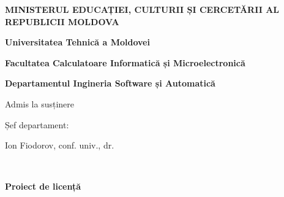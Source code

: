 \newcommand{\facultyname}{Facultatea Calculatoare Informatică și Microelectronică}
\newcommand{\departmentname}{Departamentul Ingineria Software și  Automatică}
\newcommand{\departmentchiefname}{Ion Fiodorov}
\newcommand{\departmentchieftitle}{conf. univ., dr.}
\newcommand{\consultantonename}{Nume Prenume}
\newcommand{\consultantonetitle}{X X}
\newcommand{\consultanttwoname}{Nume Prenume}
\newcommand{\consultanttwotitle}{X X}

\newcommand{\studentgroup}{FAF-18x}

\begin{titlepage}
	\begin{titlepagefont}
	    \centering

        {\bfseries MINISTERUL EDUCAȚIEI, CULTURII ȘI CERCETĂRII AL REPUBLICII MOLDOVA \par}
        {\bfseries Universitatea Tehnică a Moldovei \par}
        {\bfseries \facultyname \par}
        {\bfseries \departmentname \par}

    	\vfill
    	
    	\hfill
    	\begin{minipage}{0.35\textwidth}
    	    \raggedleft
        	{\small Admis la susținere \par}
        	{\small Șef departament: \par}
        	{\small \departmentchiefname, \departmentchieftitle \par}
        	\bigskip
        	{\small \dotfill \par}
        	{\small \dotfill\ \thesisyear \par}
        \end{minipage}
    	
    	\vfill
    	
    	{\LARGE \bfseries \thesistitlero \par}
    	{\Large \bfseries Proiect de licență \par}
    	
    	\vfill
    	

\end{titlepagefont}
\end{titlepage}
